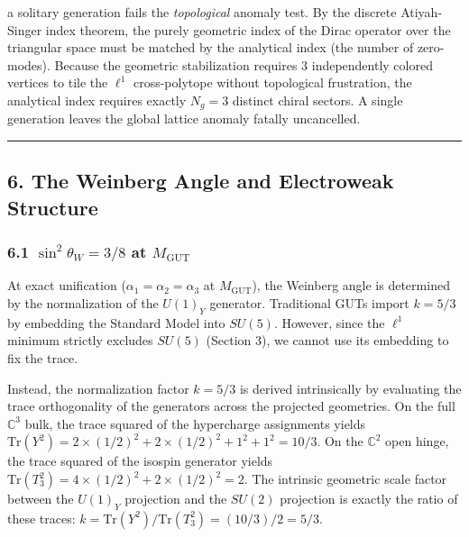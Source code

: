 \documentclass[
]{article}
\begin{document}
a solitary generation fails the \emph{topological} anomaly test. By the
discrete Atiyah-Singer index theorem, the purely geometric index of the
Dirac operator over the triangular space must be matched by the
analytical index (the number of zero-modes). Because the geometric
stabilization requires 3 independently colored vertices to tile the
\(\ell^1\) cross-polytope without topological frustration, the
analytical index requires exactly \(N_g = 3\) distinct chiral sectors. A
single generation leaves the global lattice anomaly fatally uncancelled.

\begin{center}\rule{0.5\linewidth}{0.5pt}\end{center}

\hypertarget{the-weinberg-angle-and-electroweak-structure}{%
\subsection{6. The Weinberg Angle and Electroweak
Structure}\label{the-weinberg-angle-and-electroweak-structure}}

\hypertarget{sin2theta_w-38-at-m_mathrmgut}{%
\subsubsection{\texorpdfstring{6.1 \(\sin^2\theta_W = 3/8\) at
\(M_{\mathrm{GUT}}\)}{6.1 \textbackslash sin\^{}2\textbackslash theta\_W = 3/8 at M\_\{\textbackslash mathrm\{GUT\}\}}}\label{sin2theta_w-38-at-m_mathrmgut}}

At exact unification (\(\alpha_1 = \alpha_2 = \alpha_3\) at
\(M_{\mathrm{GUT}}\)), the Weinberg angle is determined by the
normalization of the \(U(1)_Y\) generator. Traditional GUTs import
\(k=5/3\) by embedding the Standard Model into \(SU(5)\). However, since
the \(\ell^1\) minimum strictly excludes \(SU(5)\) (Section 3), we
cannot use its embedding to fix the trace.

Instead, the normalization factor \(k=5/3\) is derived intrinsically by
evaluating the trace orthogonality of the generators across the
projected geometries. On the full \(\mathbb{C}^3\) bulk, the trace
squared of the hypercharge assignments yields
\(\mathrm{Tr}(Y^2) = 2 \times (1/2)^2 + 2 \times (1/2)^2 + 1^2 + 1^2 = 10/3\).
On the \(\mathbb{C}^2\) open hinge, the trace squared of the isospin
generator yields
\(\mathrm{Tr}(T_3^2) = 4 \times (1/2)^2 + 2 \times (1/2)^2 = 2\). The
intrinsic geometric scale factor between the \(U(1)_Y\) projection and
the \(SU(2)\) projection is exactly the ratio of these traces:
\(k = \mathrm{Tr}(Y^2)/\mathrm{Tr}(T_3^2) = (10/3) / 2 = 5/3\).
\end{document}
